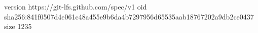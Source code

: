 version https://git-lfs.github.com/spec/v1
oid sha256:841f0507d4e061c48a455e9b6da4b7297956d65535aab18767202a9db2ce0437
size 1235
